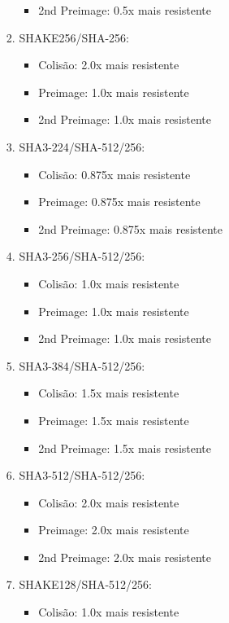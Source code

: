 \documentclass[12pt, a4paper]{article}
\begin{document}
\begin{enumerate}
\begin{enumerate}
\begin{enumerate}
\begin{itemize}
 \item 2nd Preimage: 0.5x mais resistente
 \end{itemize}
\item SHAKE256/SHA-256:
 \begin{itemize}
 \item Colisão: 2.0x mais resistente

 \item Preimage: 1.0x mais resistente

 \item 2nd Preimage: 1.0x mais resistente
 \end{itemize}
\item SHA3-224/SHA-512/256:
 \begin{itemize}
 \item Colisão: 0.875x mais resistente

 \item Preimage: 0.875x mais resistente

 \item 2nd Preimage: 0.875x mais resistente
 \end{itemize}
\item SHA3-256/SHA-512/256:
 \begin{itemize}
 \item Colisão: 1.0x mais resistente

 \item Preimage: 1.0x mais resistente

 \item 2nd Preimage: 1.0x mais resistente
 \end{itemize}
\item SHA3-384/SHA-512/256:
 \begin{itemize}
 \item Colisão: 1.5x mais resistente

 \item Preimage: 1.5x mais resistente

 \item 2nd Preimage: 1.5x mais resistente
 \end{itemize}
\item SHA3-512/SHA-512/256:
 \begin{itemize}
 \item Colisão: 2.0x mais resistente

 \item Preimage: 2.0x mais resistente

 \item 2nd Preimage: 2.0x mais resistente
 \end{itemize}
\item SHAKE128/SHA-512/256:
 \begin{itemize}
 \item Colisão: 1.0x mais resistente


\end{itemize}
\end{enumerate}
\end{enumerate}
\end{enumerate}
\end{document}
